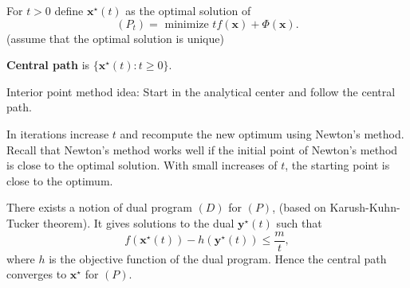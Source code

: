 \documentclass[11pt]{article}
\begin{document}



For $t > 0$ define $\mathbf{x}^\star(t)$ as the optimal solution of 
\[
(P_t) = \text{ minimize } tf(\mathbf{x}) + \Phi(\mathbf{x}).
\]
(assume that the optimal solution is unique)

\textbf{Central path} is $\{\textbf{x}^\star(t):  t \geq 0   \}$.


Interior point method idea: Start in the analytical center and follow the central path.

In iterations increase $t$ and recompute the new optimum using Newton's method.
Recall that Newton's method works well if the initial point of Newton's method is close
to the optimal solution. With small increases of $t$, the starting point is close to the
optimum.

\begin{center}
\end{center}

There exists a notion of dual program $(D)$ for $(P)$,  (based on Karush-Kuhn-Tucker theorem).
It gives solutions to the dual $\mathbf{y}^\star(t)$ such that
\[
f(\mathbf{x}^\star(t)) - h(\mathbf{y}^\star(t)) \leq \frac{m}{t},
\]
where $h$ is the objective function of the dual program.
Hence the central path converges to $\mathbf{x}^\star$ for $(P)$.
\end{document}

